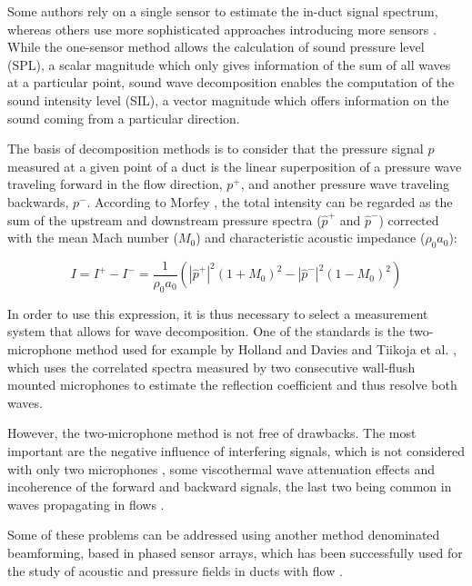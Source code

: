 Some authors \cite{figurella2012noise} rely on a single sensor to estimate the in-duct signal spectrum, whereas others use more sophisticated approaches introducing more sensors \cite{tiikoja2011inves}. While the one-sensor method allows the calculation of sound pressure level (SPL), a scalar magnitude which only gives information of the sum of all waves at a particular point, sound wave decomposition enables the computation of the sound intensity level (SIL), a vector magnitude which offers information on the sound coming from a particular direction.

The basis of decomposition methods is to consider that the pressure signal $p$ measured at a given point of a duct is the linear superposition of a pressure wave traveling forward in the flow direction, $p^+$, and another pressure wave traveling backwards, $p^-$.
According to Morfey \cite{morfey1971sound}, the total intensity can be regarded as the sum of the upstream and downstream pressure spectra ($\hat p^+$ and $\hat p^-$) corrected with the mean Mach number ($M_0$) and characteristic acoustic impedance ($\rho_0 a_0$):

\begin{equation}\label{eq:intensity}
	I=I^+-I^-=\frac{1}{\rho_0 a_0}\left(\left|\hat p^+\right|^2\left(1+M_0\right)^2-\left|\hat p^-\right|^2\left(1-M_0\right)^2\right)
\end{equation}

In order to use this expression, it is thus necessary to select a measurement system that allows for wave decomposition. One of the standards is the two-microphone method used for example by Holland and Davies \cite{holland2000measurement} and Tiikoja et al. \cite{tiikoja2011inves}, which uses the correlated spectra measured by two consecutive wall-flush mounted microphones to estimate the reflection coefficient and thus resolve both waves.

However, the two-microphone method is not free of drawbacks. The most important are the negative influence of interfering signals, which is not considered with only two microphones \cite{chung1980transfer}, some viscothermal wave attenuation effects \cite{aabom1988error} and incoherence of the forward and backward signals, the last two being common in waves propagating in flows \cite{dokumaci1997note,holland2000measurement}.

Some of these problems can be addressed using another method denominated beamforming,  based in phased sensor arrays, which has been successfully used for the study of acoustic and pressure fields in ducts with flow \cite{benajes2001estimation,desantes2001experiments,torregrosa2005note}.

